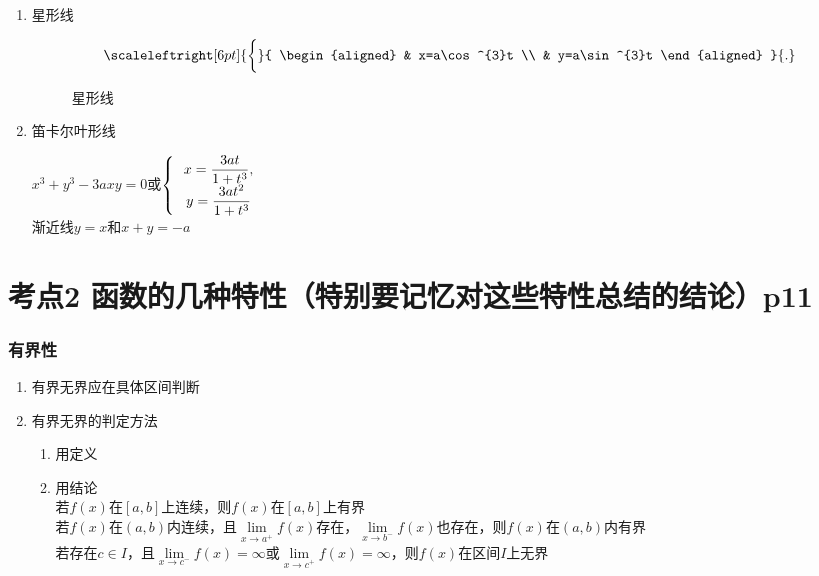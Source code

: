 \begin{enumerate}
    \item 星形线\par
    \begin{equation*}
        \scaleleftright[6pt]{\biggl\{}{
        \begin{aligned}
        & x=a\cos^{3}t \\
        & y=a\sin^{3}t
        \end{aligned}
        }{.}
    \end{equation*}
    \begin{figure}[H]
        \centering
        \caption{星形线}
    \end{figure}

    \item 笛卡尔叶形线\par
    {
        $  x^3+y^3-3axy=0$或$\left\{ \begin{array}{cl}
            \displaystyle\hspace{.2em}x=\frac{3at}{1+t^3},\\
            \displaystyle\hspace{.2em} y=\frac{3at^2}{1+t^3}
        \end{array}\right.$
    }\\
    渐近线$y=x$和$x+y=-a$
\end{enumerate}


\section{考点2 函数的几种特性（特别要记忆对这些特性总结的结论）p11}

\subsubsection{有界性}

\begin{enumerate}
    \item 有界无界应在具体区间判断
    \item 有界无界的判定方法\begin{enumerate}
        \item 用定义
        \item 用结论\\
        若$f(x)$在$[a,b]$上连续，则$f(x)$在$[a,b]$上有界\\
        若$f(x)$在$(a,b)$内连续，且$\lim \limits_{x\to a^+}f(x)$存在，$\lim \limits_{x\to b^-}f(x)$也存在，则$f(x)$在$(a,b)$内有界\\
        若存在$c\in I$，且$\lim \limits_{x\to c^-}f(x)=\infty$或$\lim \limits_{x\to c^+}f(x)=\infty$，则$f(x)$在区间$I$上无界
    \end{enumerate}
\end{enumerate}

